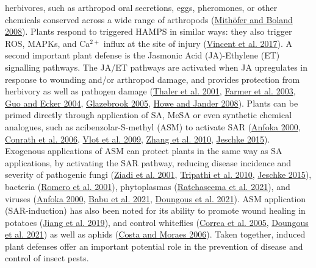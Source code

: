 \documentclass{ufdissertation}[overrideChapters] %
\begin{document}
{herbivores, such as arthropod oral secretions, eggs, pheromones, or other chemicals conserved across a wide range of arthropods (\protect\hyperlink{ref-Mithoefer2008}{Mithöfer and Boland 2008}). Plants respond to triggered HAMPS in similar ways: they also trigger ROS, MAPKs, and Ca\({^{2+}}\) influx at the site of injury (\protect\hyperlink{ref-Vincent2017}{Vincent et al. 2017}). A second important plant defense is the Jasmonic Acid (JA)-Ethylene (ET) signalling pathways. The JA/ET pathways are activated when JA upregulates in response to wounding and/or arthropod damage, and provides protection from herbivory as well as pathogen damage (\protect\hyperlink{ref-Thaler2001}{Thaler et al. 2001}, \protect\hyperlink{ref-Farmer2003}{Farmer et al. 2003}, \protect\hyperlink{ref-Guo2004}{Guo and Ecker 2004}, \protect\hyperlink{ref-Glazebrook2005}{Glazebrook 2005}, \protect\hyperlink{ref-Howe2008}{Howe and Jander 2008}). Plants can be primed directly through application of SA, MeSA or even synthetic chemical analogues, such as acibenzolar-S-methyl (ASM) to activate SAR (\protect\hyperlink{ref-Anfoka2000}{Anfoka 2000}, \protect\hyperlink{ref-Conrath2006}{Conrath et al. 2006}, \protect\hyperlink{ref-Vlot2009}{Vlot et al. 2009}, \protect\hyperlink{ref-Zhang2010}{Zhang et al. 2010}, \protect\hyperlink{ref-Jeschke2015}{Jeschke 2015}). Exogenous applications of ASM can protect plants in the same way as SA applications, by activating the SAR pathway, reducing disease incidence and severity of pathogenic fungi (\protect\hyperlink{ref-Ziadi2001}{Ziadi et al. 2001}, \protect\hyperlink{ref-Tripathi2010}{Tripathi et al. 2010}, \protect\hyperlink{ref-Jeschke2015}{Jeschke 2015}), bacteria (\protect\hyperlink{ref-Romero2001}{Romero et al. 2001}), phytoplasmas (\protect\hyperlink{ref-Ratchaseema2021}{Ratchaseema et al. 2021}), and viruses (\protect\hyperlink{ref-Anfoka2000}{Anfoka 2000}, \protect\hyperlink{ref-Babu2021}{Babu et al. 2021}, \protect\hyperlink{ref-Doungous2021}{Doungous et al. 2021}). ASM application (SAR-induction) has also been noted for its ability to promote wound healing in potatoes (\protect\hyperlink{ref-Jiang2019}{Jiang et al. 2019}), and control whiteflies (\protect\hyperlink{ref-Correa2005}{Correa et al. 2005}, \protect\hyperlink{ref-Doungous2021}{Doungous et al. 2021}) as well as aphids (\protect\hyperlink{ref-Costa2006}{Costa and Moraes 2006}). Taken together, induced plant defenses offer an important potential role in the prevention of disease and control of insect pests.

\hypertarget{effects-of-systemic-acquired-resistance-on-eriophyoid-mites}{%
}}
\end{document}
